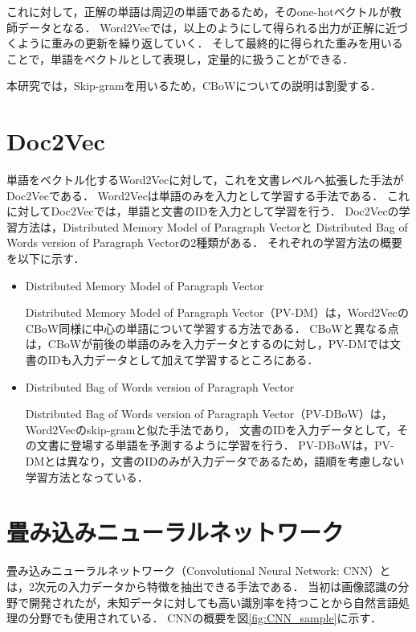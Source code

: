 \documentclass{thesis}
\begin{document}
これに対して，正解の単語は周辺の単語であるため，そのone-hotベクトルが教師データとなる．
Word2Vecでは，以上のようにして得られる出力が正解に近づくように重みの更新を繰り返していく．
そして最終的に得られた重みを用いることで，単語をベクトルとして表現し，定量的に扱うことができる．


本研究では，Skip-gramを用いるため，CBoWについての説明は割愛する．


\section{Doc2Vec}
単語をベクトル化するWord2Vecに対して，これを文書レベルへ拡張した手法がDoc2Vec\cite{doc2vec}である．
Word2Vecは単語のみを入力として学習する手法である．
これに対してDoc2Vecでは，単語と文書のIDを入力として学習を行う．
Doc2Vecの学習方法は，Distributed Memory Model of Paragraph Vectorと
Distributed Bag of Words version of Paragraph Vectorの2種類がある．
それぞれの学習方法の概要を以下に示す．

\begin{itemize}	
	\item Distributed Memory Model of Paragraph Vector
	
	Distributed Memory Model of Paragraph Vector（PV-DM）\cite{doc2vec}は，Word2VecのCBoW同様に中心の単語について学習する方法である．
	CBoWと異なる点は，CBoWが前後の単語のみを入力データとするのに対し，PV-DMでは文書のIDも入力データとして加えて学習するところにある．
	
	\item Distributed Bag of Words version of Paragraph Vector
	
	Distributed Bag of Words version of Paragraph Vector（PV-DBoW）\cite{doc2vec}は，Word2Vecのskip-gramと似た手法であり，
	文書のIDを入力データとして，その文書に登場する単語を予測するように学習を行う．
	PV-DBoWは，PV-DMとは異なり，文書のIDのみが入力データであるため，語順を考慮しない学習方法となっている．
\end{itemize}


\section{畳み込みニューラルネットワーク}
畳み込みニューラルネットワーク（Convolutional Neural Network: CNN）とは，2次元の入力データから特徴を抽出できる手法である\cite{CNN}．
当初は画像認識の分野で開発されたが，未知データに対しても高い識別率を持つことから自然言語処理の分野でも使用されている．
CNNの概要を図\ref{fig:CNN_sample}に示す．
\end{document}
